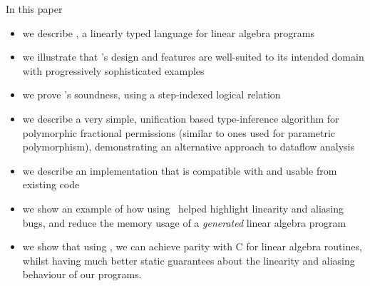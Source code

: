 In this paper
\begin{itemize}
    \item we describe \lang, a linearly typed language for linear algebra programs
    \item we illustrate that \lang's design and features are well-suited to its
        intended domain with progressively sophisticated examples
    \item we prove \lang's soundness, using a step-indexed logical relation
    \item we describe a very simple, unification based type-inference algorithm
        for polymorphic fractional permissions (similar to ones used for
        parametric polymorphism), demonstrating an alternative approach to
        dataflow analysis \cite{bierhoff}
    \item we describe an implementation that is compatible with and usable
        from existing code
    \item we show an example of how using \lang\ helped highlight linearity
        and aliasing bugs, and reduce the memory usage of a \emph{generated}
        linear algebra program
    \item we show that using \lang, we can achieve parity with C for linear
        algebra routines, whilst having much better static guarantees about the
        linearity and aliasing behaviour of our programs.
\end{itemize}

